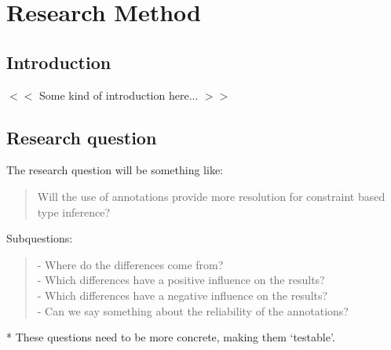 \documentclass[../main.tex]{subfiles}
\begin{document}
    \chapter{Research Method}\label{chap:research_method}

    \section{Introduction}
    $<<$ Some kind of introduction here... $>>$

    \section{Research question}
    The research question will be something like: \\
    \begin{quote}
        Will the use of annotations\footnotemark{} provide more resolution for constraint based type inference?
    \end{quote}
    Subquestions:
    \begin{quote}
        - Where do the differences come from?
        \\
        - Which differences have a positive influence on the results?
        \\
        - Which differences have a negative influence on the results?
        \\
        - Can we say something about the reliability of the annotations?
    \end{quote}
    * These questions need to be more concrete, making them `testable'.
        
\end{document}
